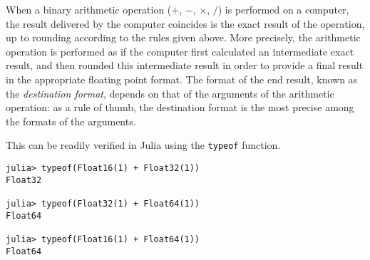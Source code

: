 When a binary arithmetic operation ($+$, $-$, $\times$, $/$) is performed on a computer,
the result delivered by the computer coincides is the exact result of the operation,
up to rounding according to the rules given above.
More precisely,
the arithmetic operation is performed as if the computer first calculated an intermediate exact result,
and then rounded this intermediate result in order to provide a final result in the appropriate floating point format.
The format of the end result,
known as the \emph{destination format},
depends on that of the arguments of the arithmetic operation:
as a rule of thumb,
the destination format is the most precise among the formats of the arguments.
\begin{example}
This can be readily verified in Julia using the \texttt{typeof} function.
\begin{verbatim}
julia> typeof(Float16(1) + Float32(1))
Float32

julia> typeof(Float32(1) + Float64(1))
Float64

julia> typeof(Float16(1) + Float64(1))
Float64
\end{verbatim}
\end{example}


